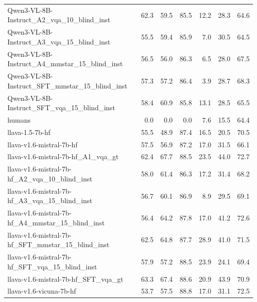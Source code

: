 \begin{tabular}{lrrrrrr}
Qwen3-VL-8B-Instruct_A2_vqa_10_blind_inst & 62.3 & 59.5 & 85.5 & 12.2 & 28.3 & 64.6 \\
Qwen3-VL-8B-Instruct_A3_vqa_15_blind_inst & 55.5 & 59.4 & 85.9 & 7.0 & 30.5 & 64.5 \\
Qwen3-VL-8B-Instruct_A4_mmstar_15_blind_inst & 56.5 & 56.0 & 86.3 & 6.5 & 28.0 & 67.5 \\
Qwen3-VL-8B-Instruct_SFT_mmstar_15_blind_inst & 57.3 & 57.2 & 86.4 & 3.9 & 28.7 & 68.3 \\
Qwen3-VL-8B-Instruct_SFT_vqa_15_blind_inst & 58.4 & 60.9 & 85.8 & 13.1 & 28.5 & 65.5 \\
humans & 0.0 & 0.0 & 0.0 & 7.6 & 15.5 & 64.4 \\
llava-1.5-7b-hf & 55.5 & 48.9 & 87.4 & 16.5 & 20.5 & 70.5 \\
llava-v1.6-mistral-7b-hf & 57.5 & 56.9 & 87.2 & 17.0 & 31.5 & 66.1 \\
llava-v1.6-mistral-7b-hf_A1_vqa_gt & 62.4 & 67.7 & 88.5 & 23.5 & 44.0 & 72.7 \\
llava-v1.6-mistral-7b-hf_A2_vqa_10_blind_inst & 58.0 & 61.4 & 86.3 & 17.2 & 31.4 & 68.2 \\
llava-v1.6-mistral-7b-hf_A3_vqa_15_blind_inst & 56.7 & 60.1 & 86.9 & 8.9 & 29.5 & 69.1 \\
llava-v1.6-mistral-7b-hf_A4_mmstar_15_blind_inst & 56.4 & 64.2 & 87.8 & 17.0 & 41.2 & 72.6 \\
llava-v1.6-mistral-7b-hf_SFT_mmstar_15_blind_inst & 62.5 & 64.8 & 87.7 & 28.9 & 41.0 & 71.5 \\
llava-v1.6-mistral-7b-hf_SFT_vqa_15_blind_inst & 57.9 & 57.2 & 88.5 & 23.9 & 24.1 & 69.4 \\
llava-v1.6-mistral-7b-hf_SFT_vqa_gt & 63.3 & 67.4 & 88.6 & 20.9 & 43.9 & 70.9 \\
llava-v1.6-vicuna-7b-hf & 53.7 & 57.5 & 88.8 & 17.0 & 31.1 & 72.5 \\
\bottomrule
\end{tabular}
